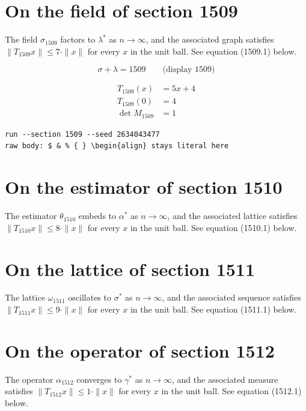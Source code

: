 \documentclass{article}
\begin{document}
\section{On the field of section 1509}
The field $\sigma_{1509}$ factors to $\lambda^{*}$ as $n \to \infty$,
and the associated graph satisfies $\|T_{1509} x\| \leq 7 \cdot \|x\|$
for every $x$ in the unit ball. See equation (1509.1) below.

$$
\sigma + \lambda = 1509 \qquad \text{(display 1509)}
$$

\begin{align}
T_{1509}(x) &= 5 x + 4 \\
T_{1509}(0) &= 4 \\
\det M_{1509} &= 1
\end{align}

\begin{verbatim}
run --section 1509 --seed 2634043477
raw body: $ & % { } \begin{align} stays literal here
\end{verbatim}

\section{On the estimator of section 1510}
The estimator $\theta_{1510}$ embeds to $\alpha^{*}$ as $n \to \infty$,
and the associated lattice satisfies $\|T_{1510} x\| \leq 8 \cdot \|x\|$
for every $x$ in the unit ball. See equation (1510.1) below.

\section{On the lattice of section 1511}
The lattice $\omega_{1511}$ oscillates to $\sigma^{*}$ as $n \to \infty$,
and the associated sequence satisfies $\|T_{1511} x\| \leq 9 \cdot \|x\|$
for every $x$ in the unit ball. See equation (1511.1) below.

\section{On the operator of section 1512}
The operator $\alpha_{1512}$ converges to $\gamma^{*}$ as $n \to \infty$,
and the associated measure satisfies $\|T_{1512} x\| \leq 1 \cdot \|x\|$
for every $x$ in the unit ball. See equation (1512.1) below.
\end{document}

